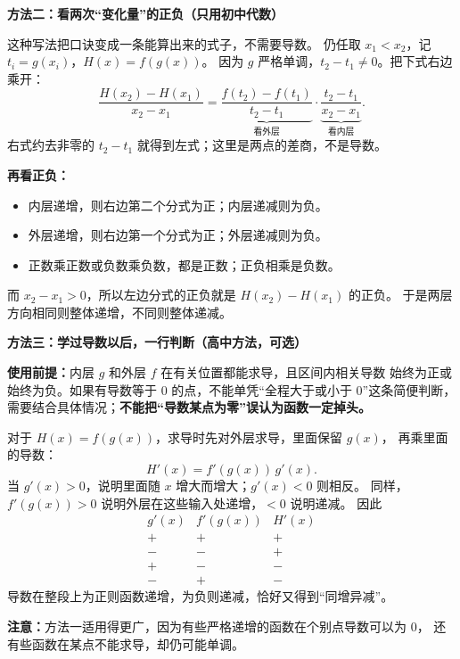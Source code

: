 \begin{proofbox}
\textbf{\textcolor{CProof}{方法二：看两次“变化量”的正负（只用初中代数）}}



这种写法把口诀变成一条能算出来的式子，不需要导数。
仍任取 $x_1<x_2$，记 $t_i=g(x_i)$，$H(x)=f(g(x))$。
因为 $g$ 严格单调，$t_2-t_1\ne0$。把下式右边乘开：
\[
\boxed{\frac{H(x_2)-H(x_1)}{x_2-x_1}
 =\underbrace{\frac{f(t_2)-f(t_1)}{t_2-t_1}}_{\text{看外层}}
 \cdot
 \underbrace{\frac{t_2-t_1}{x_2-x_1}}_{\text{看内层}}.}
\]
右式约去非零的 $t_2-t_1$ 就得到左式；这里是两点的差商，不是导数。

\textbf{再看正负：}
\begin{itemize}[leftmargin=*, itemsep=0.3em]
\item 内层递增，则右边第二个分式为正；内层递减则为负。
\item 外层递增，则右边第一个分式为正；外层递减则为负。
\item 正数乘正数或负数乘负数，都是正数；正负相乘是负数。
\end{itemize}
而 $x_2-x_1>0$，所以左边分式的正负就是 $H(x_2)-H(x_1)$ 的正负。
于是两层方向相同则整体递增，不同则整体递减。

\medskip
\end{proofbox}
\clearpage
\begin{proofbox}
\textbf{\textcolor{CProof}{方法三：学过导数以后，一行判断（高中方法，可选）}}



\textbf{使用前提：}内层 $g$ 和外层 $f$ 在有关位置都能求导，且区间内相关导数
始终为正或始终为负。如果有导数等于 $0$ 的点，不能单凭“全程大于或小于 $0$”这条简便判断，
需要结合具体情况；\textbf{不能把“导数某点为零”误认为函数一定掉头。}

对于 $H(x)=f(g(x))$，求导时先对外层求导，里面保留 $g(x)$，
再乘里面的导数：
\[
\boxed{H'(x)=f'(g(x))\,g'(x).}
\]
当 $g'(x)>0$，说明里面随 $x$ 增大而增大；$g'(x)<0$ 则相反。
同样，$f'(g(x))>0$ 说明外层在这些输入处递增，$<0$ 说明递减。
因此
\[
\begin{array}{c|c|c}
 g'(x)&f'(g(x))&H'(x)\\ \hline
 +&+&+\\ -&-&+\\ +&-&-\\ -&+&-
\end{array}
\]
导数在整段上为正则函数递增，为负则递减，恰好又得到“同增异减”。

\textbf{注意：}方法一适用得更广，因为有些严格递增的函数在个别点导数可以为 $0$，
还有些函数在某点不能求导，却仍可能单调。
\end{proofbox}
